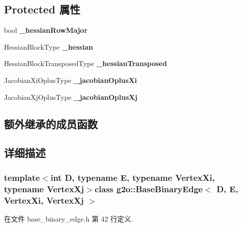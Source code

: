 \subsection*{Protected 属性}
\begin{DoxyCompactItemize}
\item 
\hypertarget{classg2o_1_1BaseBinaryEdge_aeb5c1f09a4433a6bd76ce4ab67bd9a64}{bool {\bfseries \-\_\-hessian\-Row\-Major}}\label{classg2o_1_1BaseBinaryEdge_aeb5c1f09a4433a6bd76ce4ab67bd9a64}

\item 
\hypertarget{classg2o_1_1BaseBinaryEdge_a5036f75e3b20c79cb014fcc929d8eef9}{Hessian\-Block\-Type {\bfseries \-\_\-hessian}}\label{classg2o_1_1BaseBinaryEdge_a5036f75e3b20c79cb014fcc929d8eef9}

\item 
\hypertarget{classg2o_1_1BaseBinaryEdge_aa61657904b00fcfa19df382094386f11}{Hessian\-Block\-Transposed\-Type {\bfseries \-\_\-hessian\-Transposed}}\label{classg2o_1_1BaseBinaryEdge_aa61657904b00fcfa19df382094386f11}

\item 
\hypertarget{classg2o_1_1BaseBinaryEdge_aa21b9d84924ec93192374761ee0adfa7}{Jacobian\-Xi\-Oplus\-Type {\bfseries \-\_\-jacobian\-Oplus\-Xi}}\label{classg2o_1_1BaseBinaryEdge_aa21b9d84924ec93192374761ee0adfa7}

\item 
\hypertarget{classg2o_1_1BaseBinaryEdge_ad448518247044496cb99c9d70bd1a363}{Jacobian\-Xj\-Oplus\-Type {\bfseries \-\_\-jacobian\-Oplus\-Xj}}\label{classg2o_1_1BaseBinaryEdge_ad448518247044496cb99c9d70bd1a363}

\end{DoxyCompactItemize}
\subsection*{额外继承的成员函数}


\subsection{详细描述}
\subsubsection*{template$<$int D, typename E, typename Vertex\-Xi, typename Vertex\-Xj$>$class g2o\-::\-Base\-Binary\-Edge$<$ D, E, Vertex\-Xi, Vertex\-Xj $>$}



在文件 base\-\_\-binary\-\_\-edge.\-h 第 42 行定义.



